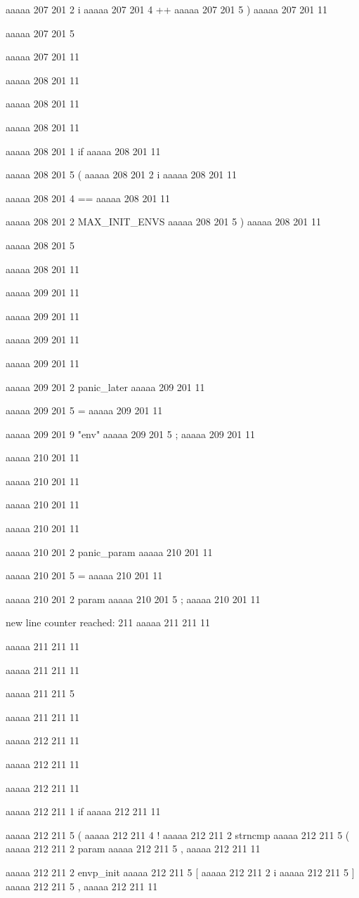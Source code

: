 {{aaaaa 207 201
2
i
aaaaa 207 201
4
++
aaaaa 207 201
5
)
aaaaa 207 201
11
 
aaaaa 207 201
5
{
aaaaa 207 201
11


aaaaa 208 201
11
	
aaaaa 208 201
11
	
aaaaa 208 201
11
	
aaaaa 208 201
1
if
aaaaa 208 201
11
 
aaaaa 208 201
5
(
aaaaa 208 201
2
i
aaaaa 208 201
11
 
aaaaa 208 201
4
==
aaaaa 208 201
11
 
aaaaa 208 201
2
MAX_INIT_ENVS
aaaaa 208 201
5
)
aaaaa 208 201
11
 
aaaaa 208 201
5
{
aaaaa 208 201
11


aaaaa 209 201
11
	
aaaaa 209 201
11
	
aaaaa 209 201
11
	
aaaaa 209 201
11
	
aaaaa 209 201
2
panic_later
aaaaa 209 201
11
 
aaaaa 209 201
5
=
aaaaa 209 201
11
 
aaaaa 209 201
9
"env"
aaaaa 209 201
5
;
aaaaa 209 201
11


aaaaa 210 201
11
	
aaaaa 210 201
11
	
aaaaa 210 201
11
	
aaaaa 210 201
11
	
aaaaa 210 201
2
panic_param
aaaaa 210 201
11
 
aaaaa 210 201
5
=
aaaaa 210 201
11
 
aaaaa 210 201
2
param
aaaaa 210 201
5
;
aaaaa 210 201
11


new line counter reached: 211
aaaaa 211 211
11
	
aaaaa 211 211
11
	
aaaaa 211 211
11
	
aaaaa 211 211
5
}
aaaaa 211 211
11


aaaaa 212 211
11
	
aaaaa 212 211
11
	
aaaaa 212 211
11
	
aaaaa 212 211
1
if
aaaaa 212 211
11
 
aaaaa 212 211
5
(
aaaaa 212 211
4
!
aaaaa 212 211
2
strncmp
aaaaa 212 211
5
(
aaaaa 212 211
2
param
aaaaa 212 211
5
,
aaaaa 212 211
11
 
aaaaa 212 211
2
envp_init
aaaaa 212 211
5
[
aaaaa 212 211
2
i
aaaaa 212 211
5
]
aaaaa 212 211
5
,
aaaaa 212 211
11
 
}}}
